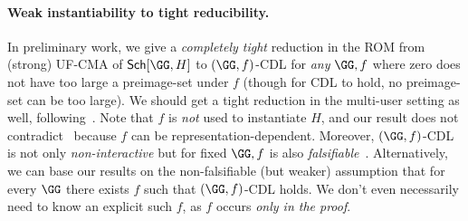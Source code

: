 \paragraph*{Weak instantiability to tight reducibility.} In preliminary work, we give a \emph{completely tight} reduction in the ROM from (strong) UF-CMA of  $\mathsf{Sch}[\GG,H]$ to $(\GG,f)$-CDL for \emph{any} $\GG,f$ where zero does not have  too large a preimage-set under $f$ (though for CDL to hold, no preimage-set can be too large). %
We should get a tight reduction  in the multi-user setting as well, following~\cite{C:KilMasPan16}.  Note that $f$ is \emph{not} used to instantiate $H$, and our result does not contradict~\cite{AC:FleJagSch14} because $f$ can be representation-dependent. Moreover, $(\GG,f)$-CDL is not only \emph{non-interactive}  but for  fixed $\GG,f$ is also \emph{falsifiable}~\cite{C:Naor03}. Alternatively, we can base our results on the non-falsifiable (but weaker) assumption that for every $\GG$ there exists $f$ such that $(\GG,f)$-CDL holds. We don't even necessarily need to know an explicit such $f$, as $f$ occurs \emph{only in the proof}.

